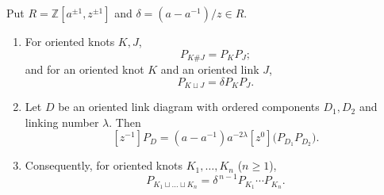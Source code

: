 \begin{lemma}
\label{CV:lem:homflyrows}\leanok
Put $R=\mathbb Z[a^{\pm1},z^{\pm1}]$ and
$\delta=(a-a^{-1})/z\in R$.
\begin{enumerate}
\item[(i)] For oriented knots $K,J$,
\[
 P_{K\# J}=P_KP_J;
\]
and for an oriented knot $K$ and an oriented link $J$,
\[
 P_{K\sqcup J}=\delta P_KP_J.
\]
\item[(ii)] Let $D$ be an oriented link diagram with ordered components
$D_1,D_2$ and linking number $\lambda$. Then
\[
 [z^{-1}]P_D=(a-a^{-1})a^{-2\lambda}
       [z^0]\bigl(P_{D_1}P_{D_2}\bigr).
\]
\item[(iii)] Consequently, for oriented knots $K_1,\dots,K_n$ ($n\geq1$),
\[
 P_{K_1\sqcup\dots\sqcup K_n}=\delta^{\,n-1}P_{K_1}\cdots P_{K_n}.
\]
\end{enumerate}
\end{lemma}
